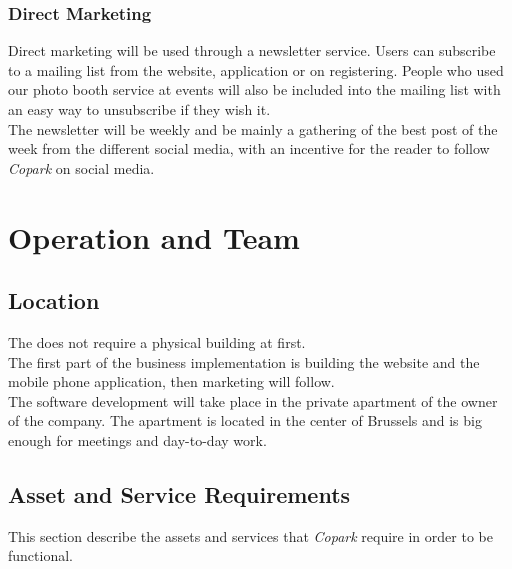 \documentclass[12pt,a4paper,oneside]{book}
\newcommand{\bp}{\textit{Copark }}
\begin{document}
\subsection{Direct Marketing}

Direct marketing will be used through a newsletter service. Users can subscribe to a mailing list from the website, application or on registering. People who used our photo booth service at events will also be included into the mailing list with an easy way to unsubscribe if they wish it.\\
The newsletter will be weekly and be mainly a gathering of the best post of the week from the different social media, with an incentive for the reader to follow \bp on social media.

\chapter{Operation and Team}

\section{Location}
The does not require a physical building at first.\\
The first part of the business implementation is building the website and the mobile phone application, then marketing will follow.\\

The software development will take place in the private apartment of the owner of the company. The apartment is located in the center of Brussels and is big enough for meetings and day-to-day work.\\

\section{Asset and Service Requirements}
This section describe the assets and services that \bp require in order to be functional.
\end{document}
